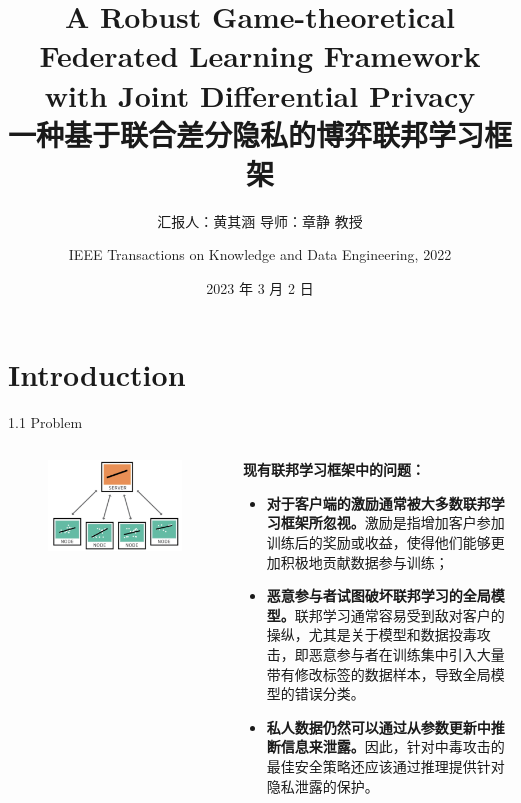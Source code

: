 \documentclass{sintefbeamer}
\title{A Robust Game-theoretical Federated Learning Framework with Joint Differential Privacy\\
一种基于联合差分隐私的博弈联邦学习框架}
\subtitle{汇报人：黄其涵 \qquad 导师：章静 教授 \qquad }
\author{
IEEE Transactions on Knowledge and Data Engineering, 2022}
\date{2023 年 3 月 2 日}
\theoremstyle{definition}
\begin{document}
\maketitle

\section{Introduction}{}

\begin{frame}{1.1 Problem}{\empty}
\begin{columns}
\begin{column}{0.35\textwidth}
\begin{figure}[ht]
\centering
\includegraphics[width=1\textwidth]{images/fl_view}
\end{figure}
\end{column}
\begin{column}{0.65\textwidth}
\textbf{现有联邦学习框架中的问题：}
\begin{itemize}
	\item \textbf{\alert{对于客户端的激励通常被大多数联邦学习框架所忽视。}}激励是指增加客户参加训练后的奖励或收益，使得他们能够更加积极地贡献数据参与训练；
	\item \textbf{\alert{恶意参与者试图破坏联邦学习的全局模型。}}联邦学习通常容易受到敌对客户的操纵，尤其是关于模型和数据投毒攻击，即恶意参与者在训练集中引入大量带有修改标签的数据样本，导致全局模型的错误分类。
	\item \textbf{\alert{私人数据仍然可以通过从参数更新中推断信息来泄露。}}因此，针对中毒攻击的最佳安全策略还应该通过推理提供针对隐私泄露的保护。
\end{itemize}
\end{column}
\end{columns}
\end{frame}
\end{document}
